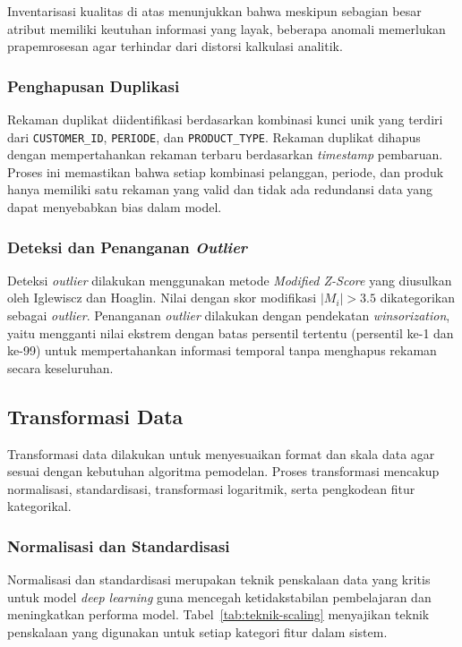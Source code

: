 Inventarisasi kualitas di atas menunjukkan bahwa meskipun sebagian besar atribut memiliki keutuhan informasi yang layak, beberapa anomali memerlukan prapemrosesan agar terhindar dari distorsi kalkulasi analitik.

\subsubsection{Penghapusan Duplikasi}

Rekaman duplikat diidentifikasi berdasarkan kombinasi kunci unik yang terdiri dari \texttt{CUSTOMER\_ID}, \texttt{PERIODE}, dan \texttt{PRODUCT\_TYPE}. Rekaman duplikat dihapus dengan mempertahankan rekaman terbaru berdasarkan \textit{timestamp} pembaruan. Proses ini memastikan bahwa setiap kombinasi pelanggan, periode, dan produk hanya memiliki satu rekaman yang valid dan tidak ada redundansi data yang dapat menyebabkan bias dalam model.

\subsubsection{Deteksi dan Penanganan \textit{Outlier}}

Deteksi \textit{outlier} dilakukan menggunakan metode \textit{Modified Z-Score} yang diusulkan oleh Iglewiscz dan Hoaglin. Nilai dengan skor modifikasi $|M_i| > 3.5$ dikategorikan sebagai \textit{outlier}. Penanganan \textit{outlier} dilakukan dengan pendekatan \textit{winsorization}, yaitu mengganti nilai ekstrem dengan batas persentil tertentu (persentil ke-1 dan ke-99) untuk mempertahankan informasi temporal tanpa menghapus rekaman secara keseluruhan.

\subsection{Transformasi Data}
\label{subsec:transformasi-data}

Transformasi data dilakukan untuk menyesuaikan format dan skala data agar sesuai dengan kebutuhan algoritma pemodelan. Proses transformasi mencakup normalisasi, standardisasi, transformasi logaritmik, serta pengkodean fitur kategorikal.

\subsubsection{Normalisasi dan Standardisasi}

Normalisasi dan standardisasi merupakan teknik penskalaan data yang kritis untuk model \textit{deep learning} guna mencegah ketidakstabilan pembelajaran dan meningkatkan performa model. Tabel~\ref{tab:teknik-scaling} menyajikan teknik penskalaan yang digunakan untuk setiap kategori fitur dalam sistem.

